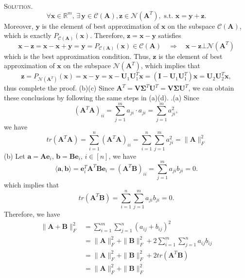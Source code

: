 \documentclass[12pt, a4paper, oneside]{ctexart}
\newenvironment{solution}{\par\noindent\textsc{Solution. }}{\\\par}
\begin{document}
\begin{solution}
	\[
	\forall \mathbf{x} \in \mathbb{R}^m,\, \exists\, \mathbf{y} \in \mathcal{C}(\mathbf{A}), \mathbf{z} \in \mathcal{N}(\mathbf{A}^T), \text{ s.t. } \mathbf{x = y + z}.
	\]
	Moreover, $\mathbf{y}$ is the element of best approximation of $\mathbf{x}$ on the subspace $\mathcal{C}(\mathbf{A})$, which is exactly $P_{\mathcal{C}(\mathbf{A})}(\mathbf{x})$. Therefore, $\mathbf{z} = \mathbf{x - y}$ satisfies
	\[
	\mathbf{x - z} = \mathbf{x - x + y} = \mathbf{y} = P_{\mathcal{C}(\mathbf{A})}(\mathbf{x}) \in \mathcal{C}(\mathbf{A}) \quad \Rightarrow \quad \mathbf{x - z} \bot \mathcal{N}(\mathbf{A}^T)
	\]
	which is the best approximation condition. Thus, $\mathbf{z}$ is the element of best approximation of $\mathbf{x}$ on the subspace $\mathcal{N}(\mathbf{A}^T)$, which implies that
	\[
	\mathbf{z} = P_{\mathcal{N}(\mathbf{A}^T)}(\mathbf{x}) = \mathbf{x - y} = \mathbf{x} - \mathbf{U}_1\mathbf{U}_1^T\mathbf{x} = (\mathbf{I} - \mathbf{U}_1\mathbf{U}_1^T)\mathbf{x} = \mathbf{U}_2\mathbf{U}_2^T\mathbf{x},
	\]
	thus complete the proof.
	\newline\newline
	(b)(c) Since $\mathbf{A}^T = \mathbf{V}\boldsymbol{\Sigma}^T\mathbf{U}^T = \mathbf{V}\boldsymbol{\Sigma}\mathbf{U}^T$, we can obtain these conclusions by following the same steps in (a)(d).
	\newline{}.(a) Since
    \[
    (\mathbf{A}^T\mathbf{A})_{ii} = \sum_{j=1}^{m}a_{ji}\cdot a_{ji} = \sum_{j=1}^{m}a_{ji}^2,
    \]
    we have
    \[
    tr(\mathbf{A}^T\mathbf{A}) = \sum_{i=1}^{n}(\mathbf{A}^T\mathbf{A})_{ii} = \sum_{i=1}^{n}\sum_{j=1}^{m}a_{ji}^2 = \|\mathbf{A}\|_F^2
    \]
    \newline
    (b) Let $\mathbf{a} = \mathbf{Ae}_i$, $\mathbf{b} = \mathbf{Be}_i$, $i\in[n]$, we have
    \[
    \langle\mathbf{a},\mathbf{b}\rangle = \mathbf{e}_i^T\mathbf{A}^T\mathbf{Be}_i = (\mathbf{A}^T\mathbf{B})_{ii} = \sum_{j=1}^{m}a_{ji}b_{ji} = 0.
    \]
    which implies that
    \[
    tr(\mathbf{A}^T\mathbf{B}) = \sum_{i=1}^{n}\sum_{j=1}^{m}a_{ji}b_{ji} = 0.
    \]
    Therefore, we have
    \begin{align*}
    \|\mathbf{A+B}\|_F^2 & = \sum_{i=1}^{m}\sum_{j=1}^{n}(a_{ij}+b_{ij})^2 \\
    & = \|\mathbf{A}\|_F^2 + \|\mathbf{B}\|_F^2 + 2\sum_{i=1}^{m}\sum_{j=1}^{n}a_{ij}b_{ij} \\
    & = \|\mathbf{A}\|_F^2 + \|\mathbf{B}\|_F^2 + 2tr(\mathbf{A}^T\mathbf{B}) \\
    & = \|\mathbf{A}\|_F^2 + \|\mathbf{B}\|_F^2
    \end{align*}
\end{solution}
\end{document}
